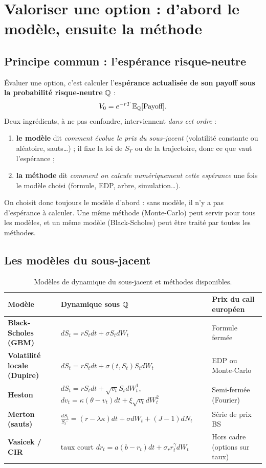 \chapter{Valoriser une option : d'abord le modèle, ensuite la méthode}

\section{Principe commun : l'espérance risque-neutre}

Évaluer une option, c'est calculer l'\textbf{espérance actualisée de son payoff sous la probabilité risque-neutre} $\mathbb{Q}$ :
\[
V_0 = e^{-rT}\,\mathbb{E}_{\mathbb{Q}}[\text{Payoff}].
\]
Deux ingrédients, à ne pas confondre, interviennent \emph{dans cet ordre} :
\begin{enumerate}[nosep]
\item \textbf{le modèle} dit \emph{comment évolue le prix du sous-jacent} (volatilité constante ou aléatoire, sauts\dots) ; il fixe la loi de $S_T$ ou de la trajectoire, donc ce que vaut l'espérance ;
\item \textbf{la méthode} dit \emph{comment on calcule numériquement cette espérance} une fois le modèle choisi (formule, EDP, arbre, simulation\dots).
\end{enumerate}
On choisit donc toujours le modèle d'abord : sans modèle, il n'y a pas d'espérance à calculer. Une même méthode (Monte-Carlo) peut servir pour tous les modèles, et un même modèle (Black-Scholes) peut être traité par toutes les méthodes.

\section{Les modèles du sous-jacent}

\begin{table}[H]
\centering\small
\begin{tabularx}{\textwidth}{>{\bfseries}p{2.7cm}p{6.2cm}L}
\toprule
Modèle & Dynamique sous $\mathbb{Q}$ & Prix du call européen \\
\midrule
Black-Scholes (GBM) & $dS_t = rS_tdt + \sigma S_tdW_t$ & Formule fermée \\
Volatilité locale (Dupire) & $dS_t = rS_tdt + \sigma(t,S_t)S_tdW_t$ & EDP ou Monte-Carlo \\
Heston & $dS_t = rS_tdt + \sqrt{v_t}S_tdW^1_t$,\ \ $dv_t = \kappa(\theta-v_t)dt + \xi\sqrt{v_t}dW^2_t$ & Semi-fermée (Fourier) \\
Merton (sauts) & $\frac{dS_t}{S_{t^-}} = (r-\lambda\kappa)dt + \sigma dW_t + (J-1)dN_t$ & Série de prix BS \\
Vasicek / CIR & taux court $dr_t = a(b-r_t)dt + \sigma_r r_t^{\gamma}dW_t$ & Hors cadre (options sur taux) \\
\bottomrule
\end{tabularx}
\caption{Modèles de dynamique du sous-jacent et méthodes disponibles.}
\label{tab:modeles}
\end{table}

